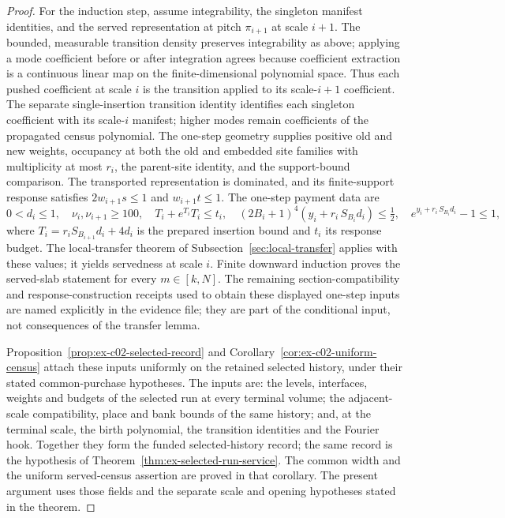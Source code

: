 \begin{proof}
For the induction step, assume integrability, the singleton manifest identities, and the served representation at pitch $\pi_{i+1}$ at scale $i+1$. The bounded, measurable transition density preserves integrability as above; applying a mode coefficient before or after integration agrees because coefficient extraction is a continuous linear map on the finite-dimensional polynomial space. Thus each pushed coefficient at scale $i$ is the transition applied to its scale-$i+1$ coefficient. The separate single-insertion transition identity identifies each singleton coefficient with its scale-$i$ manifest; higher modes remain coefficients of the propagated census polynomial. The one-step geometry supplies positive old and new weights, occupancy at both the old and embedded site families with multiplicity at most $r_i$, the parent-site identity, and the support-bound comparison. The transported representation is dominated, and its finite-support response satisfies $2w_{i+1}s\leq1$ and $w_{i+1}t\leq1$. The one-step payment data are
\[
 0<d_i\leq1,\quad \nu_i,\nu_{i+1}\geq100,\quad
 T_i+e^{T_i}T_i\leq t_i,\quad
 (2B_i+1)^4(y_i+r_i\,S_{B_i}d_i)\leq\tfrac12,
 \quad e^{y_i+r_i\,S_{B_i}d_i}-1\leq1,
\]
where $T_i=r_iS_{B_{i+1}}d_i+4d_i$ is the prepared insertion bound and $t_i$ its response budget. The local-transfer theorem of Subsection~\ref{sec:local-transfer} applies with these values; it yields servedness at scale $i$. Finite downward induction proves the served-slab statement for every $m\in[k,N]$. The remaining section-compatibility and response-construction receipts used to obtain these displayed one-step inputs are named explicitly in the evidence file; they are part of the conditional input, not consequences of the transfer lemma.

Proposition~\ref{prop:ex-c02-selected-record} and
Corollary~\ref{cor:ex-c02-uniform-census} attach these inputs
uniformly on the retained selected history, under their stated
common-purchase hypotheses. The inputs are: the levels, interfaces, weights and budgets of the selected run at every terminal volume; the adjacent-scale compatibility, place and bank bounds of the same history; and, at the terminal scale, the birth polynomial, the transition identities and the Fourier hook. Together they form the funded selected-history record; the same record is the hypothesis of Theorem~\ref{thm:ex-selected-run-service}. The common width and the uniform served-census assertion are
proved in that corollary. The present argument uses those fields
and the separate scale and opening hypotheses stated in the theorem.


\end{proof}
